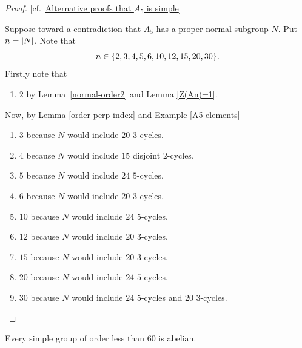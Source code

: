 \begin{proof} {[cf.~\href{https://math.stackexchange.com/a/329293/269050}{Alternative proofs that  $A_5$ is simple}]}

Suppose toward a contradiction that $A_5$ has a proper normal subgroup $N$. Put $n=\left\vert{N}\right\vert$. Note that
$$
    n\in\{2, 3, 4, 5, 6, 10, 12, 15, 20, 30\}.
$$
Firstly note that
\begin{enumerate}[$n\ne$]
    \item $2$ by Lemma~\ref{normal-order2} and Lemma \ref{Z(An)=1}.
\end{enumerate}
Now, by Lemma \ref{order-perp-index} and Example \ref{A5-elements}
\begin{enumerate}[$n\ne$]
    \item $3$ because $N$ would include $20$ $3$-cycles.
    \item $4$ because $N$ would include $15$ disjoint $2$-cycles.
    \item $5$ because $N$ would include $24$ $5$-cycles.
    \item $6$ because $N$ would include $20$ $3$-cycles.
    \item $10$ because $N$ would include $24$ $5$-cycles.
    \item $12$ because $N$ would include $20$ $3$-cycles.
    \item $15$ because $N$ would include $20$ $3$-cycles.
    \item $20$ because $N$ would include $24$ $5$-cycles.
    \item $30$ because $N$ would include $24$ $5$-cycles and $20$ $3$-cycles.
\end{enumerate}
 \end{proof}

\begin{prop}
    Every simple group of order less than\/ $60$ is abelian.
\end{prop}

